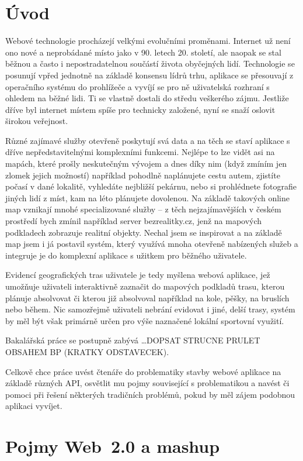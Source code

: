 \chapter*{Úvod}

Webové technologie procházejí velkými evolučními proměnami. Internet
už není ono nové a neprobádané místo jako v 90. letech 20.
století, ale naopak se stal běžnou a často i nepostradatelnou
součástí života obyčejných lidí. Technologie se posunují vpřed
jednotně na základě konsensu lídrů trhu, aplikace se přesouvají z
operačního systému do prohlížeče a vyvíjí se pro ně uživatelská
rozhraní s ohledem na běžné lidi. Ti se vlastně dostali do středu
veškerého zájmu. Jestliže dříve byl internet místem spíše pro
technicky založené, nyní se snaží oslovit širokou veřejnost.

Různé zajímavé služby otevřeně poskytují svá data a na těch se staví
aplikace s dříve nepředstavitelnými komplexními funkcemi. Nejlépe to lze vidět
asi na mapách, které prošly neskutečným vývojem a dnes díky nim (když
zmíním jen zlomek jejich možností) například pohodlně naplánujete
cestu autem, zjistíte počasí v dané lokalitě, vyhledáte nej\-bližší
pekárnu, nebo si prohlédnete fotografie jiných lidí z míst, kam na
léto plánujete dovolenou. Na základě takových online map vznikají
mnohé specializované služby -- z těch nej\-zajímavějších v českém
prostředí bych zmínil například server bezrealitky.cz, jenž na
mapových podkladech zobrazuje realitní objekty. Nechal jsem se
inspirovat a na základě map jsem i já postavil systém, který využívá
mnoha otevřeně nabízených služeb a integruje je do komplexní aplikace
s užitkem pro běžného uživatele.

Evidencí geografických tras uživatele je tedy myšlena webová aplikace,
jež umožňuje uživateli interaktivně zaznačit do mapových podkladů trasu,
kterou plánuje absolvovat či kterou již absolvoval například na kole,
pěšky, na bruslích nebo během. Nic samozřejmě uživateli nebrání
evidovat i jiné, delší trasy, systém by měl být však primárně určen
pro výše naznačené lokální sportovní využití.

Bakalářská práce se postupně zabývá \ldots DOPSAT STRUCNE PRULET
OBSAHEM BP (KRATKY ODSTAVECEK).

Celkově chce práce uvést čtenáře do problematiky stavby webové
aplikace na základě různých API, osvětlit mu pojmy související s
problematikou a navést či pomoci při řešení některých tradičních
problémů, pokud by měl zájem podobnou aplikaci vyvíjet.

\chapter{Pojmy Web~2.0 a mashup}\label{mashup}

